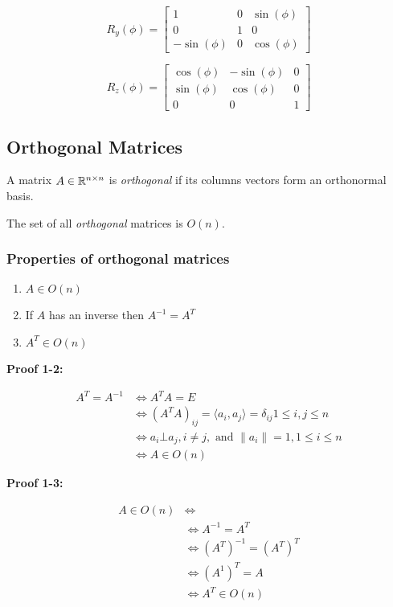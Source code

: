 \[
    R_y (\phi) =
    \begin{bmatrix}
        1 & 0 & \sin(\phi) \\
        0 & 1 & 0 \\
        -\sin(\phi) & 0 & \cos(\phi)
    \end{bmatrix}
\]

\[
    R_z (\phi) =
    \begin{bmatrix}
        \cos(\phi) & -\sin(\phi) & 0 \\
        \sin(\phi) & \cos(\phi) & 0 \\
        0 & 0 & 1
    \end{bmatrix}
\]

\subsection{Orthogonal Matrices}

A matrix \(A \in \mathbb{R}^{n \times n}\) is \emph{orthogonal} if its columns vectors form an orthonormal 
basis.

The set of all \emph{orthogonal} matrices is \(O(n)\).

\subsubsection{Properties of orthogonal matrices}

\begin{enumerate}
    \item \(A \in O(n)\)
    \item If \(A\) has an inverse then \(A^{-1} = A^T\)
    \item \(A^T \in O(n)\)
\end{enumerate}

\textbf{Proof 1-2:}

\begin{align*}
    A^T = A^{-1} &\iff A^T A = E\\
                 &\iff (A^T A)_{ij} = \langle a_i, a_j\rangle = \delta_{ij} 1 \le i,j \le n\\
                 &\iff a_i \bot a_j, i \ne j, \text{ and } \|a_i\| = 1, 1 \le i \le n\\
                 &\iff A \in O(n)
\end{align*}

\textbf{Proof 1-3:}

\begin{align*}
    A \in O(n) &\iff \\
               &\iff A^{-1} = A^T\\
               &\iff (A^T)^{-1} = (A^T)^T \\
               &\iff (A^{1})^{T} = A\\
               &\iff A^T \in O(n)
\end{align*}

